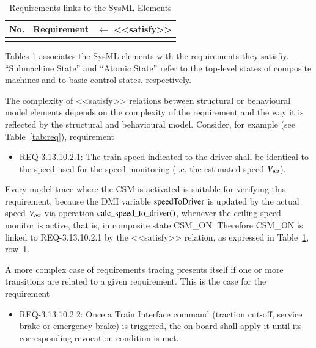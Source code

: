 \begin{table}[htbp]
\renewcommand{\arraystretch}{1.2}
\caption{Requirements links to the SysML
  Elements \label{table:req-tracing} }
\centering
\tabsize
\begin{tabular}{rrl}

\hline\hline
{\bf No.} & {\bf Requirement} & $\longleftarrow$ {\sf <<satisfy>>}
\\
\hline

\\
\hline\hline
\end{tabular}


\end{table}


Tables \ref{table:req-tracing} associates 
the SysML elements with the requirements they satisfiy.  ``Submachine
State'' and  ``Atomic State'' refer to the top-level states of composite
machines and to basic control states, respectively. 
 

The complexity of {\sf <<satisfy>>} relations between structural or behavioural model elements depends on the complexity of the requirement and the way it is reflected by the structural and behavioural model. Consider, for example (see Table~\ref{tab:req}), requirement  
\begin{itemize}
\item REQ-3.13.10.2.1: The train speed indicated to the driver shall be identical to the speed used for the speed monitoring (i.e. the estimated speed ${V_{\text{\sl est}}}$).
\end{itemize}

Every model trace where the CSM is activated is suitable for verifying this requirement, because the DMI variable $\text{speedToDriver}$ is updated by the actual speed ${V_{\text{\sl est}}}$ via operation $\text{calc\_speed\_to\_driver()}$, whenever the ceiling speed monitor is active, that is, in composite state {\sf CSM\_ON}. Therefore 
{\sf CSM\_ON} is linked to REQ-3.13.10.2.1 by the {\sf <<satisfy>>} relation, as expressed
in Table~\ref{table:req-tracing}, row~1. 

 


A more complex case of requirements tracing presents itself if one or more transitions are related to a given requirement. This is the case for the requirement
\begin{itemize}
\item REQ-3.13.10.2.2: Once a Train Interface command (traction cut-off, service brake or emergency brake) is triggered, the on-board shall apply it until its corresponding revocation condition is met.
\end{itemize}

